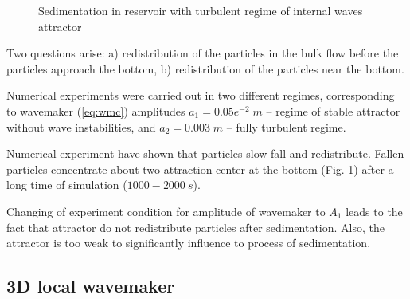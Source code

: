 \documentclass[a4wide,fontsize=12pt]{article}
\begin{document}
\begin{figure}[h!]
\centering
    \begin{minipage}[t]{0.45\textwidth}
        \centering
        \label{fig:turbSed2Da}
    \end{minipage}
    \begin{minipage}[t]{0.45\textwidth}
        \centering
        \label{fig:turbSed2Db}
    \end{minipage}
    \caption{Sedimentation in reservoir with turbulent regime of internal waves attractor}
    \label{fig:turbSed}
\end{figure}

Two questions arise: a) redistribution of the particles in the bulk flow before the particles approach the bottom, b) redistribution of the particles near the bottom.

Numerical experiments were carried out in two different regimes, corresponding to wavemaker (\ref{eq:wmc})  amplitudes $a_1=0.05e^{-2}\;m$ -- regime of stable attractor without wave instabilities, and $a_2=0.003\;m$ -- fully turbulent regime. 

Numerical experiment have shown that particles slow fall and redistribute. Fallen particles concentrate about two attraction center at the bottom (Fig. \ref{fig:turbSed}) after a long time of simulation ($1000-2000\ s$).

Changing of experiment condition for amplitude of wavemaker to $A_1$ leads to the fact that attractor do not redistribute particles after sedimentation. Also, the attractor is too weak to significantly influence to process of sedimentation.



\subsection{3D local wavemaker}
\end{document}
